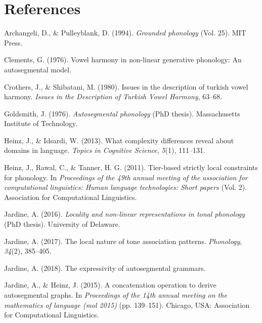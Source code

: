 \documentclass[floatsintext,man]{apa6}
\theoremstyle{definition}
\theoremstyle{definition}
\theoremstyle{definition}
\theoremstyle{remark}
\begin{document}
\newpage

\section{References}\label{references}

\setlength{\parindent}{-0.5in} \setlength{\leftskip}{0.5in}

\hypertarget{refs}{}
\hypertarget{ref-archangelipulleyblank1994}{}
Archangeli, D., \& Pulleyblank, D. (1994). \emph{Grounded phonology}
(Vol. 25). MIT Press.

\hypertarget{ref-Clements1976}{}
Clements, G. (1976). Vowel harmony in non-linear generative phonology:
An autosegmental model.

\hypertarget{ref-crothersshibatani1980}{}
Crothers, J., \& Shibatani, M. (1980). Issues in the description of
turkish vowel harmony. \emph{Issues in the Description of Turkish Vowel
Harmony}, 63--68.

\hypertarget{ref-Goldsmith1976}{}
Goldsmith, J. (1976). \emph{Autosegmental phonology} (PhD thesis).
Massachusetts Institute of Technology.

\hypertarget{ref-heinzidsardi2013}{}
Heinz, J., \& Idsardi, W. (2013). What complexity differences reveal
about domains in language. \emph{Topics in Cognitive Science},
\emph{5}(1), 111--131.

\hypertarget{ref-heinzetaltsl}{}
Heinz, J., Rawal, C., \& Tanner, H. G. (2011). Tier-based strictly local
constraints for phonology. In \emph{Proceedings of the 49th annual
meeting of the association for computational linguistics: Human language
technologies: Short papers} (Vol. 2). Association for Computational
Linguistics.

\hypertarget{ref-jardinediss}{}
Jardine, A. (2016). \emph{Locality and non-linear representations in
tonal phonology} (PhD thesis). University of Delaware.

\hypertarget{ref-jardinelocaltone}{}
Jardine, A. (2017). The local nature of tone association patterns.
\emph{Phonology}, \emph{34}(2), 385--405.

\hypertarget{ref-jardineexpressag}{}
Jardine, A. (2018). The expressivity of autosegmental grammars.

\hypertarget{ref-jardineheinz2015}{}
Jardine, A., \& Heinz, J. (2015). A concatenation operation to derive
autosegmental graphs. In \emph{Proceedings of the 14th annual meeting on
the mathematics of language (mol 2015)} (pp. 139--151). Chicago, USA:
Association for Computational Linguistics.
\end{document}
